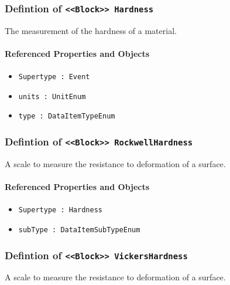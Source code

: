 \subsubsection{Defintion of \texttt{<<Block>> Hardness}}
  \label{type:Hardness}

\FloatBarrier

The measurement of the hardness of a material.

\FloatBarrier
\paragraph{Referenced Properties and Objects}

\begin{itemize}
\item \texttt{Supertype : Event}

\item \texttt{units : UnitEnum}

\item \texttt{type : DataItemTypeEnum}

\end{itemize}
\FloatBarrier
\subsubsection{Defintion of \texttt{<<Block>> RockwellHardness}}
  \label{type:RockwellHardness}

\FloatBarrier

A scale to measure the resistance to deformation of a surface.

\FloatBarrier
\paragraph{Referenced Properties and Objects}

\begin{itemize}
\item \texttt{Supertype : Hardness}

\item \texttt{subType : DataItemSubTypeEnum}

\end{itemize}
\FloatBarrier
\subsubsection{Defintion of \texttt{<<Block>> VickersHardness}}
  \label{type:VickersHardness}

\FloatBarrier

A scale to measure the resistance to deformation of a surface.

